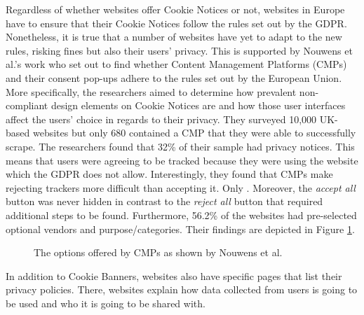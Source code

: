 \documentclass[../main.tex]{subfiles}
\begin{document}
Regardless of whether websites offer Cookie Notices or not, websites in Europe have to ensure that their Cookie Notices follow the rules set out by the GDPR. Nonetheless, it is true that a number of websites have yet to adapt to the new rules, risking fines but also their users’ privacy. This is supported by Nouwens et al.'s work \cite{nouwens2020dark} who set out to find whether Content Management Platforms (CMPs) and their consent pop-ups adhere to the rules set out by the European Union. More specifically, the researchers aimed to determine how prevalent non-compliant design elements on Cookie Notices are and how those user interfaces affect the users’ choice in regards to their privacy. They surveyed 10,000 UK-based websites but only 680 contained a CMP that they were able to successfully scrape. The researchers found that 32\% of their sample had  privacy notices. This means that users were agreeing to be tracked because they were using the website which the GDPR does not allow. Interestingly, they found that CMPs make rejecting trackers more difficult than accepting it. Only . Moreover, the \textit{accept all} button was never hidden in contrast to the \textit{reject all} button that required additional steps to be found. Furthermore, 56.2\% of the websites had pre-selected optional vendors and purpose/categories. Their findings are depicted in Figure \ref{fig:nouwens}.

\begin{figure}[ht]
    \centering
    \caption{The options offered by CMPs as shown by Nouwens et al.}
    \label{fig:nouwens}
\end{figure}

In addition to Cookie Banners, websites also have specific pages that list their privacy policies. There, websites explain how data collected from users is going to be used and who it is going to be shared with. 
\end{document}
